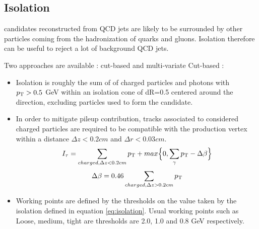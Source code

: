 \subsection{Isolation}


\tauh candidates reconstructed from QCD jets are likely to be surrounded by other particles coming from the hadronization of quarks and gluons.
Isolation therefore can be useful to reject a lot of background QCD jets.

Two approaches are available : cut-based and multi-variate
Cut-based : 
\begin{itemize}
    \item Isolation is roughly the sum of \pt of charged particles and photons with $p_{\mathrm{T}} > 0.5$ GeV within an isolation cone of dR=0.5 centered around the \tauh direction, excluding particles used to form the \tauh candidate.
    \item In order to mitigate pileup contribution, tracks associated to considered charged particles are required to be compatible with the \tauh production vertex within a distance $\Delta z < 0.2 cm$ and $\Delta r < 0.03 cm$.
\begin{equation}
    I_{\tau} = \sum_{charged, \Delta z<0.2 cm} p_{\mathrm{T}} + max \Big\{ 0, \sum_{\gamma} p_{\mathrm{T}} - \Delta\beta \Big\}
    \label{eq:isolation}
\end{equation}
\begin{equation}
    \Delta \beta = 0.46 \sum_{charged,\Delta z>0.2 cm} p_{\mathrm{T}}
\end{equation}
    \item Working points are defined by the thresholds on the value taken by the isolation defined in equation \ref{eq:isolation}. Usual working points such as Loose, medium, tight are thresholds are 2.0, 1.0 and 0.8 GeV respectively.
\end{itemize}

